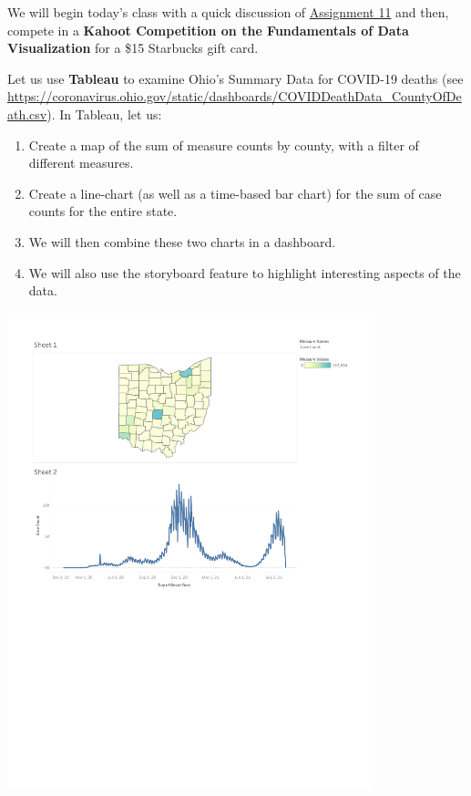 \documentclass[letterpaper,addpoints, 11pt]{exam}
\begin{document}
\begin{questions}

\question[0] We will begin today's class with a quick discussion of \href{https://miamioh.instructure.com/courses/179812/quizzes/506303}{Assignment 11} and then, compete in a \textbf{Kahoot Competition on the Fundamentals of Data Visualization} for a \$15 Starbucks gift card. 

\vspace{0.5in}

\question[0] Let us use \textbf{Tableau} to examine Ohio's Summary Data for COVID-19 deaths (see \url{https://coronavirus.ohio.gov/static/dashboards/COVIDDeathData_CountyOfDeath.csv}). In Tableau, let us:
\begin{enumerate}[label=(\Alph*)]
	\item Create a map of the sum of measure counts by county, with a filter of different measures.
	\item Create a line-chart (as well as a time-based bar chart) for the sum of case counts for the entire state.
	\item We will then combine these two charts in a dashboard.
	\item We will also use the storyboard feature to highlight interesting aspects of the data.
\end{enumerate}

\begin{center}
	\includegraphics[width=0.8\textwidth,frame, clip, trim={0.5in 4.5in 0.5in 0.5in} ]{../../figures/tableau_example.pdf}
\end{center}



\end{questions}
\end{document}
